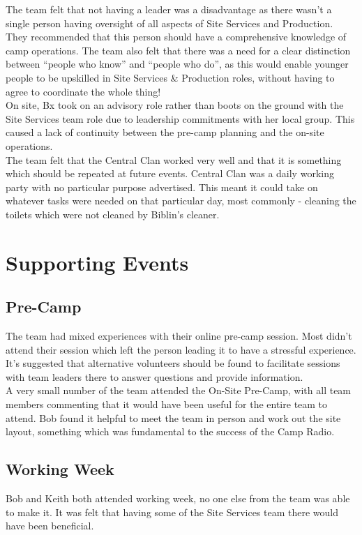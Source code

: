 The team felt that not having a leader was a disadvantage as there wasn't a single person having oversight of all aspects of Site Services and Production. They recommended that this person should have a comprehensive knowledge of camp operations. The team also felt that there was a need for a clear distinction between ``people who know'' and ``people who do'', as this would enable younger people to be upskilled in Site Services \& Production roles, without having to agree to coordinate the whole thing!\\

On site, Bx took on an advisory role rather than boots on the ground with the Site Services team role due to leadership commitments with her local group. This caused a lack of continuity between the pre-camp planning and the on-site operations.\\ 

The team felt that the Central Clan worked very well and that it is something which should be repeated at future events. Central Clan was a daily working party with no particular purpose advertised. This meant it could take on whatever tasks were needed on that particular day, most commonly - cleaning the toilets which were not cleaned by Biblin's cleaner. 

\section{Supporting Events}
\subsection{Pre-Camp}
The team had mixed experiences with their online pre-camp session. Most didn't attend their session which left the person leading it to have a stressful experience. It's suggested that alternative volunteers should be found to facilitate sessions with team leaders there to answer questions and provide information.\\

A very small number of the team attended the On-Site Pre-Camp, with all team members commenting that it would have been useful for the entire team to attend. Bob found it helpful to meet the team in person and work out the site layout, something which was fundamental to the success of the Camp Radio.
\subsection{Working Week}
Bob and Keith both attended working week, no one else from the team was able to make it. It was felt that having some of the Site Services team there would have been beneficial.
